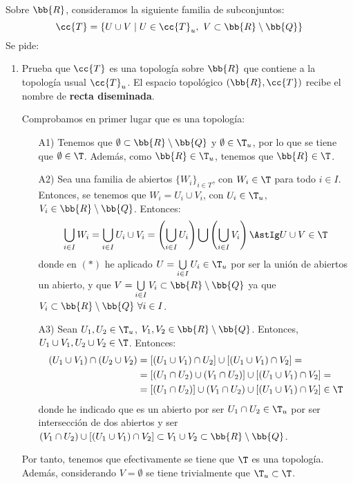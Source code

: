 \begin{ejercicio}\label{ej:3.1.16}
    Sobre $\bb{R}$, consideramos la siguiente familia de subconjuntos:
    \begin{equation*}
        \cc{T}=\{U\cup V\mid U\in \cc{T}_u,~V\subset \bb{R}\setminus \bb{Q}\}
    \end{equation*}
    Se pide:
    \begin{enumerate}[label=\alph*)]
        \item Prueba que $\cc{T}$ es una topología sobre $\bb{R}$ que contiene a la topología usual $\cc{T}_u$. El espacio topológico $(\bb{R},\cc{T})$ recibe el nombre de \textbf{recta diseminada}.

        Comprobamos en primer lugar que es una topología:
        \begin{enumerate}
            \item[A1)] Tenemos que $\emptyset\subset \bb{R}\setminus \bb{Q}$ y $\emptyset\in \T_u$, por lo que se tiene que $\emptyset\in \T$. Además, como $\bb{R}\in \T_u$, tenemos que $\bb{R}\in \T$.
            
            \item[A2)] Sea una familia de abiertos $\{W_i\}_{i\in T}$, con $W_i\in \T$ para todo $i\in I$. Entonces, se tenemos que $W_i=U_i\cup V_i$, con $U_i\in \T_u$, $V_i\in \bb{R}\setminus\bb{Q}$. Entonces:
            \begin{equation*}
                \bigcup_{i\in I}W_i = \bigcup_{i\in I} U_i\cup V_i = \left(\bigcup_{i\in I}U_i\right) \bigcup \left(\bigcup_{i\in I}V_i\right)  \AstIg U\cup V\in \T
            \end{equation*}
            donde en $(\ast)$ he aplicado $U=\bigcup\limits_{i\in I}U_i\in \T_u$ por ser la unión de abiertos un abierto, y que $V=\bigcup\limits_{i\in I}V_i\subset \bb{R}\setminus \bb{Q}$ ya que $V_i\subset \bb{R}\setminus \bb{Q}~\forall i\in I$.
            
            \item[A3)] Sean $U_1,U_2\in \T_u$, $V_1,V_2\in \bb{R}\setminus \bb{Q}$. Entonces, $U_1\cup V_1,U_2\cup V_2\in \T$. Entonces:
            \begin{equation*}\begin{split}
                (U_1\cup V_1)\cap (U_2\cup V_2) &= [(U_1\cup V_1)\cap U_2] \cup [(U_1\cup V_1)\cap V_2]
                =\\&= [(U_1\cap U_2)\cup (V_1\cap U_2)] \cup [(U_1\cup V_1)\cap V_2]
                =\\&= [(U_1\cap U_2)]\cup (V_1\cap U_2) \cup [(U_1\cup V_1)\cap V_2]
                \in \T
            \end{split}\end{equation*}
            donde he indicado que es un abierto por ser $U_1\cap U_2\in \T_u$ por ser intersección de dos abiertos y ser $(V_1\cap U_2) \cup [(U_1\cup V_1)\cap V_2]\subset V_1\cup V_2\subset \bb{R}\setminus \bb{Q}$.
        \end{enumerate}
        Por tanto, tenemos que efectivamente se tiene que $\T$ es una topología. Además, considerando $V=\emptyset$ se tiene trivialmente que $\T_u\subset \T$.


\end{enumerate}
\end{ejercicio}
